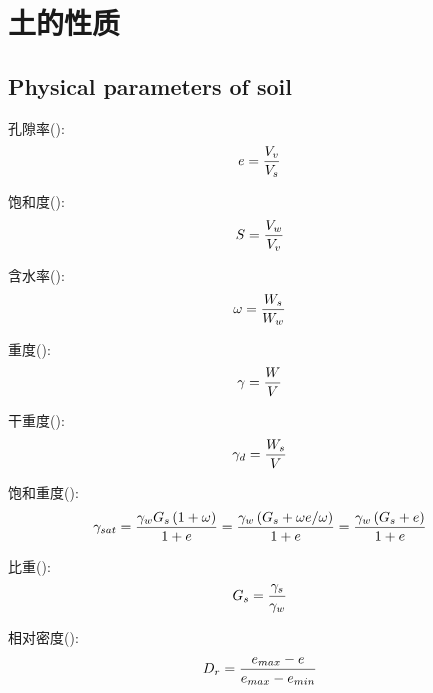 \chapter{土的性质}

\section{Physical parameters of soil}

孔隙率():
\begin{equation}
\index{孔隙率:e}
e={V_v\over V_s}\newline
\end{equation}

饱和度():
\begin{equation}
\index{饱和度:S}
S={V_w\over V_v}
\end{equation}

含水率():
\begin{equation}
\index{含水率:$\omega$}
\omega={W_s\over W_w}
\end{equation}

重度():
\begin{equation}
\index{重度:$\gamma$}
\gamma={W\over V}
\end{equation}

干重度():
\begin{equation}
\index{干重度:$\omega_d$}
\gamma_d={W_s\over V}
\end{equation}

饱和重度():
\begin{equation}
\index{饱和重度:$\gamma_{sat}$}
\gamma_{sat}={{\gamma_wG_s\left(1+\omega\right)}\over{1+e}}=%
{{\gamma_w\left(G_s+\omega e/\omega\right)}\over{1+e}}%
={{\gamma_w\left(G_s+e\right)}\over{1+e}}
\end{equation}

比重():
\begin{equation}
\index{比重:$G_s$}
G_s = {\gamma_s\over\gamma_w}
\end{equation}

相对密度():
\begin{equation}
\index{相对密度:$D_r$}
D_r = {e_{max} - e\over{e_{max} - e_{min}}}
\end{equation}
